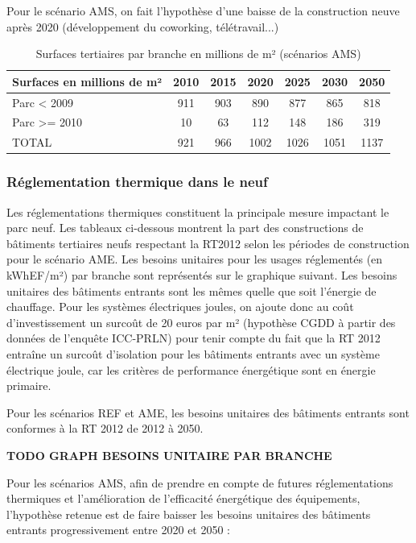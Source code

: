 \documentclass[10.5pt,a4paper]{article}
\begin{document}
{Pour le scénario AMS, on fait l’hypothèse d’une baisse de la construction neuve après 2020 (développement du coworking, télétravail...) 

\begin{table}[h!]
\caption{Surfaces tertiaires par branche en millions de m² (scénarios AMS)}
\begin{center}
\begin{tabular}{|l|c|c|c|c|c|c|}
\hline
Surfaces en millions de m²	& 2010	& 2015	& 2020 & 	2025 & 	2030	& 2050 \\
\hline
Parc < 2009		& 911	& 903	& 890 	& 877		& 865			& 818 \\
Parc >= 2010	& 10	& 63	& 112		& 148		& 186			& 319 \\
TOTAL					& 921	& 966	& 1002	& 1026 	& 1051	 	& 1137 \\
\hline
\end{tabular}
\end{center}
\end{table}

\subsubsection{Réglementation thermique dans le neuf}

Les réglementations thermiques constituent la principale mesure impactant le parc neuf. Les tableaux ci-dessous montrent la part des constructions de bâtiments tertiaires neufs respectant la RT2012 selon les périodes de construction pour le scénario AME. Les besoins unitaires pour les usages réglementés (en kWhEF/m²) par branche sont représentés sur le graphique suivant. Les besoins unitaires des bâtiments entrants sont les mêmes quelle que soit l’énergie de chauffage. Pour les systèmes électriques joules, on ajoute donc au coût d’investissement un surcoût de 20 euros par m² (hypothèse CGDD à partir des données de l’enquête ICC-PRLN) pour tenir compte du fait que la RT 2012 entraîne un surcoût d’isolation pour les bâtiments entrants avec un système électrique joule, car les critères de performance énergétique sont en énergie primaire.

Pour les scénarios REF et AME, les besoins unitaires des bâtiments entrants sont conformes à la RT 2012 de 2012 à 2050.

\textbf{TODO GRAPH BESOINS UNITAIRE PAR BRANCHE}

Pour les scénarios AMS, afin de prendre en compte de futures réglementations thermiques et l’amélioration de l’efficacité énergétique des équipements, l’hypothèse retenue est de faire baisser les besoins unitaires des bâtiments entrants progressivement entre 2020 et 2050 :

}
\end{document}
